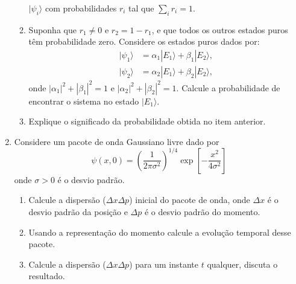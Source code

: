 \begin{enumerate}
\begin{enumerate}
		            $|\psi_i\rangle$ com probabilidades $r_i$ tal que $\sum_i r_i = 1$.
		      \item Suponha que $r_1 \neq 0 $ e $r_2 = 1 - r_1$, e que todos os outros
		            estados puros têm probabilidade zero. Considere os estados puros dados
		            por:
		            \begin{align}
			            |\psi_1\rangle & = \alpha_1 |E_1\rangle + \beta_1 |E_2\rangle, \\
			            |\psi_2\rangle & = \alpha_2 |E_1\rangle + \beta_2 |E_2\rangle,
		            \end{align}
		            onde $|\alpha_1|^2 + |\beta_1|^2 = 1$ e $|\alpha_2|^2 + |\beta_2|^2 = 1$.
		            Calcule a probabilidade de encontrar o sistema no estado $|E_1\rangle$.
		      \item Explique o significado da probabilidade obtida no item anterior.
	      \end{enumerate}
	\item Considere um pacote de onda Gaussiano livre dado por
	      $$
		      \psi(x,0) = \left(\frac{1}{2\pi \sigma^2}\right)^{1/4} \exp\left[{-\frac{x^2}{4\sigma^2}}\right]
	      $$
	      onde $\sigma > 0$ é o desvio padrão.
	      \begin{enumerate}
		      \item Calcule a dispersão ($\Delta x\Delta p$) inicial do pacote de onda,
		            onde \(\Delta x\) é o desvio padrão da posição e \(\Delta p\) é o desvio
		            padrão do momento.
		      \item Usando a representação do momento calcule a evolução temporal desse
		            pacote.
		      \item Calcule a dispersão (\(\Delta x\Delta p\)) para um instante $t$
		            qualquer, discuta o resultado.
	      \end{enumerate}

\end{enumerate}


